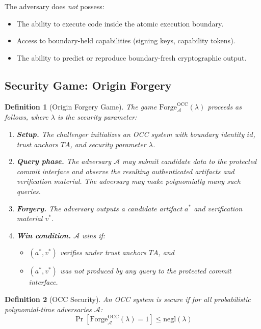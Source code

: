 \documentclass[11pt,letterpaper]{article}
\theoremstyle{occplain}
\newtheorem{definition}{Definition}[section]
\theoremstyle{occremark}
\begin{document}
The adversary does \emph{not} possess:
\begin{itemize}
  \item The ability to execute code inside the atomic execution boundary.
  \item Access to boundary-held capabilities (signing keys, capability tokens).
  \item The ability to predict or reproduce boundary-fresh cryptographic output.
\end{itemize}


\subsection{Security Game: Origin Forgery}
\label{sec:forgery-game}

\begin{definition}[Origin Forgery Game]
\label{def:forgery-game}
The game $\mathrm{Forge}_{\mathcal{A}}^{\mathrm{OCC}}(\lambda)$ proceeds as follows, where $\lambda$ is the security parameter:
\begin{enumerate}
  \item \textbf{Setup.} The challenger initializes an OCC system with boundary identity $\mathit{id}$, trust anchors $\mathit{TA}$, and security parameter $\lambda$.
  \item \textbf{Query phase.} The adversary $\mathcal{A}$ may submit candidate data to the protected commit interface and observe the resulting authenticated artifacts and verification material. The adversary may make polynomially many such queries.
  \item \textbf{Forgery.} The adversary outputs a candidate artifact $a^*$ and verification material $v^*$.
  \item \textbf{Win condition.} $\mathcal{A}$ wins if:
  \begin{itemize}
    \item $(a^*, v^*)$ verifies under trust anchors $\mathit{TA}$, and
    \item $(a^*, v^*)$ was not produced by any query to the protected commit interface.
  \end{itemize}
\end{enumerate}
\end{definition}

\begin{definition}[OCC Security]
\label{def:occ-security}
An OCC system is \emph{secure} if for all probabilistic polynomial-time adversaries $\mathcal{A}$:
\[
  \Pr[\mathrm{Forge}_{\mathcal{A}}^{\mathrm{OCC}}(\lambda) = 1] \leq \mathrm{negl}(\lambda)
\]
\end{definition}
\end{document}
